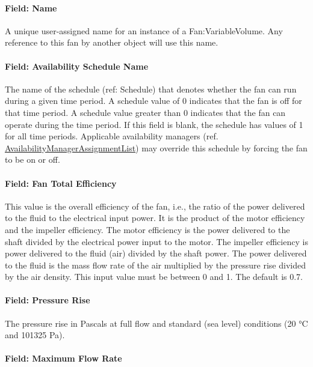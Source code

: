 \paragraph{Field: Name}\label{field-name-2-015}

A unique user-assigned name for an instance of a Fan:VariableVolume. Any reference to this fan by another object will use this name.

\paragraph{Field: Availability Schedule Name}\label{field-availability-schedule-name-2-002}

The name of the schedule (ref: Schedule) that denotes whether the fan can run during a given time period. A schedule value of 0 indicates that the fan is off for that time period. A schedule value greater than 0 indicates that the fan can operate during the time period. If this field is blank, the schedule has values of 1 for all time periods. Applicable availability managers (ref. \hyperref[availabilitymanagerassignmentlist]{AvailabilityManagerAssignmentList}) may override this schedule by forcing the fan to be on or off.

\paragraph{Field: Fan Total Efficiency}\label{field-fan-total-efficiency-2}

This value is the overall efficiency of the fan, i.e., the ratio of the power delivered to the fluid to the electrical input power. It is the product of the motor efficiency and the impeller efficiency. The motor efficiency is the power delivered to the shaft divided by the electrical power input to the motor. The impeller efficiency is power delivered to the fluid (air) divided by the shaft power. The power delivered to the fluid is the mass flow rate of the air multiplied by the pressure rise divided by the air density. This input value must be between 0 and 1. The default is 0.7.

\paragraph{Field: Pressure Rise}\label{field-pressure-rise-2}

The pressure rise in Pascals at full flow and standard (sea level) conditions (20 °C and 101325 Pa).

\paragraph{Field: Maximum Flow Rate}\label{field-maximum-flow-rate-2}

